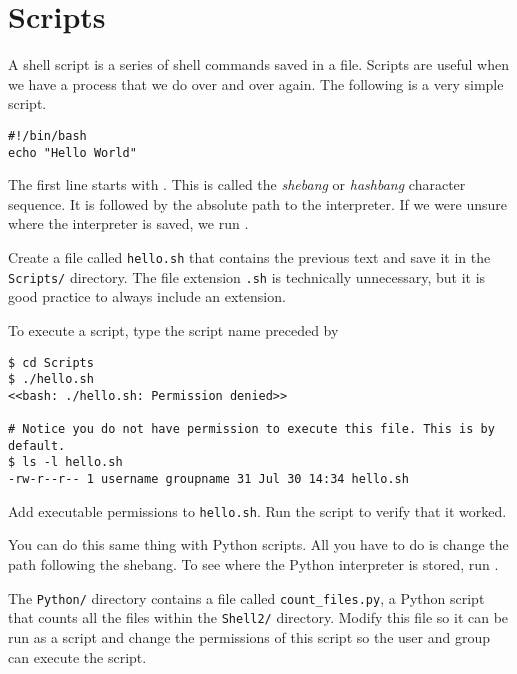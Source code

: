 \section*{Scripts} %

A shell script is a series of shell commands saved in a file.
Scripts are useful when we have a process that we do over and over again.
The following is a very simple script.

\begin{lstlisting}
#!/bin/bash
echo "Hello World"
\end{lstlisting}

The first line starts with .
This is called the \emph{shebang} or \emph{hashbang} character sequence.
It is followed by the absolute path to the  interpreter.
If we were unsure where the  interpreter is saved, we run .

\begin{problem}
Create a file called \texttt{hello.sh} that contains the previous text and save it in the \texttt{Scripts/} directory.
The file extension \texttt{.sh} is technically unnecessary, but it is good practice to always include an extension.
\end{problem}

To execute a script, type the script name preceded by 

\begin{lstlisting}
$ cd Scripts
$ ./hello.sh
<<bash: ./hello.sh: Permission denied>>

# Notice you do not have permission to execute this file. This is by default.
$ ls -l hello.sh
-rw-r--r-- 1 username groupname 31 Jul 30 14:34 hello.sh
\end{lstlisting}

\begin{problem}
Add executable permissions to \texttt{hello.sh}.
Run the script to verify that it worked.
\end{problem}

You can do this same thing with Python scripts.
All you have to do is change the path following the shebang.
To see where the Python interpreter is stored, run .

\begin{problem}
The \texttt{Python/} directory contains a file called \texttt{count\_files.py}, a Python script that counts all the files within the \texttt{Shell2/} directory.
Modify this file so it can be run as a script and change the permissions of this script so the user and group can execute the script.
\end{problem}

